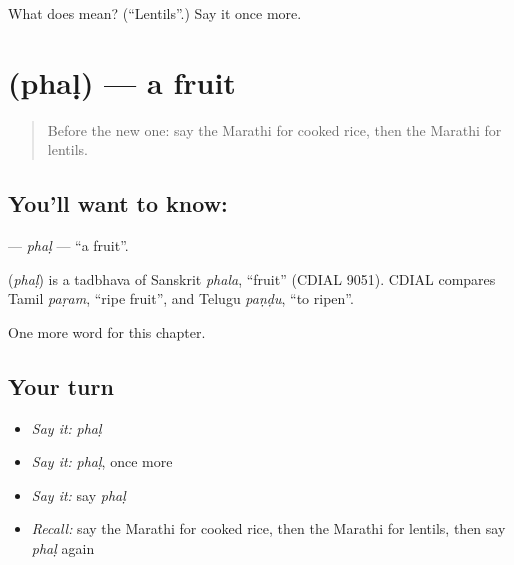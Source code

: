 \begin{tcolorbox}[breakable,colback=teal!4,colframe=teal!35!black,title={Before you move on}]
What does  mean? (\textquotedblleft{}Lentils\textquotedblright{}.) Say it once more.
\end{tcolorbox}
\section[\texorpdfstring{\mr{फळ} (phaḷ)}{फळ (phaḷ)}]{ (phaḷ) — a fruit}

\label{lesson:MR-C85-phal}



\begin{quote}
Before the new one: say the Marathi for cooked rice, then the Marathi for lentils.
\end{quote}

\subsection*{You'll want to know: }
\textbf{} — \emph{phaḷ} — \textquotedblleft{}a fruit\textquotedblright{}.

\begin{cousinweb}
\textbf{} (\emph{phaḷ}) is a tadbhava of Sanskrit \emph{phala}, \textquotedblleft{}fruit\textquotedblright{} (CDIAL 9051). CDIAL compares Tamil \emph{paṛam}, \textquotedblleft{}ripe fruit\textquotedblright{}, and Telugu \emph{paṇḍu}, \textquotedblleft{}to ripen\textquotedblright{}.
\end{cousinweb}

\begin{grammarlens}[title={What you've built}]
One more word for this chapter.
\end{grammarlens}

\subsection*{Your turn}
\begin{itemize}
\raggedright
  \item \emph{Say it:} \emph{phaḷ}
  \item \emph{Say it:} \emph{phaḷ}, once more
  \item \emph{Say it:} say \emph{phaḷ}
  \item \emph{Recall:} say the Marathi for cooked rice, then the Marathi for lentils, then say \emph{phaḷ} again
\end{itemize}


